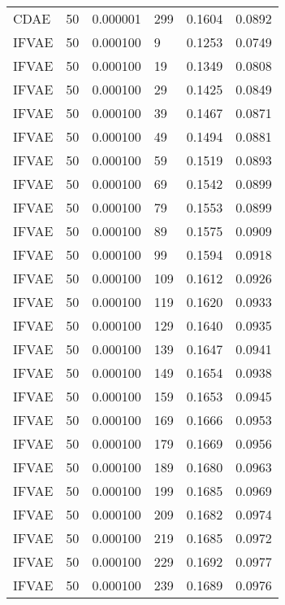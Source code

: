 \begin{tabular}{llrlrr}
    CDAE &   50 &  0.000001 &   299 &  0.1604 &       0.0892 \\
   IFVAE &   50 &  0.000100 &     9 &  0.1253 &       0.0749 \\
   IFVAE &   50 &  0.000100 &    19 &  0.1349 &       0.0808 \\
   IFVAE &   50 &  0.000100 &    29 &  0.1425 &       0.0849 \\
   IFVAE &   50 &  0.000100 &    39 &  0.1467 &       0.0871 \\
   IFVAE &   50 &  0.000100 &    49 &  0.1494 &       0.0881 \\
   IFVAE &   50 &  0.000100 &    59 &  0.1519 &       0.0893 \\
   IFVAE &   50 &  0.000100 &    69 &  0.1542 &       0.0899 \\
   IFVAE &   50 &  0.000100 &    79 &  0.1553 &       0.0899 \\
   IFVAE &   50 &  0.000100 &    89 &  0.1575 &       0.0909 \\
   IFVAE &   50 &  0.000100 &    99 &  0.1594 &       0.0918 \\
   IFVAE &   50 &  0.000100 &   109 &  0.1612 &       0.0926 \\
   IFVAE &   50 &  0.000100 &   119 &  0.1620 &       0.0933 \\
   IFVAE &   50 &  0.000100 &   129 &  0.1640 &       0.0935 \\
   IFVAE &   50 &  0.000100 &   139 &  0.1647 &       0.0941 \\
   IFVAE &   50 &  0.000100 &   149 &  0.1654 &       0.0938 \\
   IFVAE &   50 &  0.000100 &   159 &  0.1653 &       0.0945 \\
   IFVAE &   50 &  0.000100 &   169 &  0.1666 &       0.0953 \\
   IFVAE &   50 &  0.000100 &   179 &  0.1669 &       0.0956 \\
   IFVAE &   50 &  0.000100 &   189 &  0.1680 &       0.0963 \\
   IFVAE &   50 &  0.000100 &   199 &  0.1685 &       0.0969 \\
   IFVAE &   50 &  0.000100 &   209 &  0.1682 &       0.0974 \\
   IFVAE &   50 &  0.000100 &   219 &  0.1685 &       0.0972 \\
   IFVAE &   50 &  0.000100 &   229 &  0.1692 &       0.0977 \\
   IFVAE &   50 &  0.000100 &   239 &  0.1689 &       0.0976 \\

\end{tabular}
